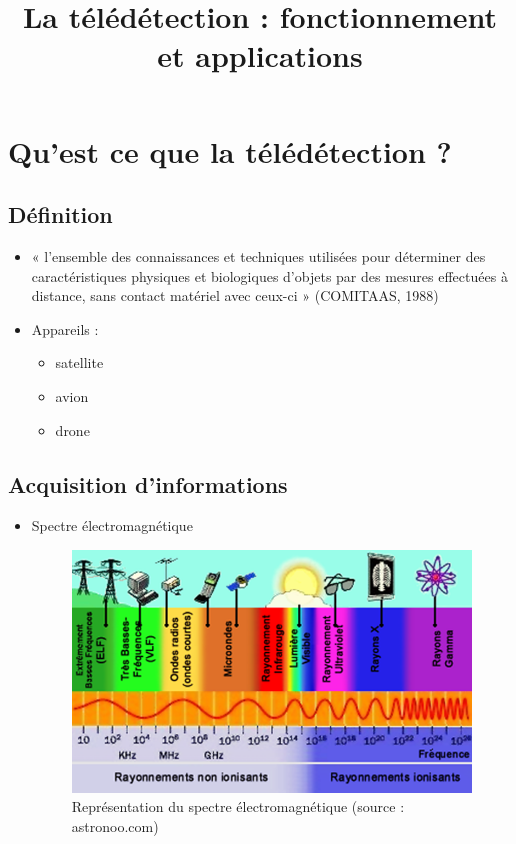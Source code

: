 \documentclass[11pt]{beamer}
\title{La télédétection : fonctionnement et applications}
\begin{document}
\begin{frame}
\titlepage
\end{frame}

\begin{frame}
\tableofcontents
\end{frame}

\section{Qu'est ce que la télédétection ?}
\subsection{Définition}
\begin{frame}{}
\begin{itemize}
\item « l’ensemble des connaissances et techniques utilisées pour déterminer des caractéristiques physiques et biologiques d’objets par des mesures effectuées à distance, sans contact matériel avec ceux-ci » (COMITAAS, 1988)
\item Appareils :
\begin{itemize}
\item satellite
\item avion
\item drone
\end{itemize}
\end{itemize}
\end{frame}

\subsection{Acquisition d'informations}
\begin{frame}{}
\begin{itemize}
\item Spectre électromagnétique
\begin{figure}[!h]
\includegraphics[scale=0.40]{img/spectre-electromagnetique.png}
\caption{Représentation du spectre électromagnétique (source : astronoo.com)}
\label{spectreElectro}
\end{figure}
\end{itemize}
\end{frame}
\end{document}
